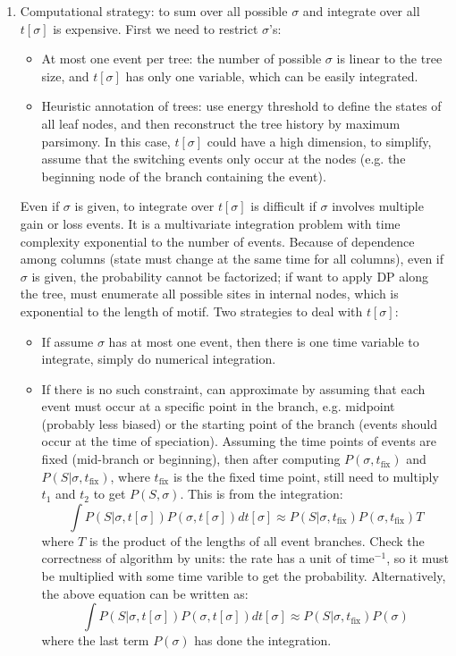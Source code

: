 \documentclass[11pt]{article}
\begin{document}
\begin{enumerate}
\begin{enumerate}
\item Computational strategy: to sum over all possible $\sigma$ and integrate over all $t[\sigma]$ is expensive. First we need to restrict $\sigma$'s: 
\begin{itemize}
\item At most one event per tree: the number of possible $\sigma$ is linear to the tree size, and $t[\sigma]$ has only one variable, which can be easily integrated. 
\item Heuristic annotation of trees: use energy threshold to define the states of all leaf nodes, and then reconstruct the tree history by maximum parsimony. In this case, $t[\sigma]$ could have a high dimension, to simplify, assume that the switching events only occur at the nodes (e.g. the beginning node of the branch containing the event). 
\end{itemize}
Even if $\sigma$ is given, to integrate over $t[\sigma]$ is difficult if $\sigma$ involves multiple gain or loss events. It is a multivariate integration problem with time complexity exponential to the number of events. Because of dependence among columns (state must change at the same time for all columns), even if $\sigma$ is given, the probability cannot be factorized; if want to apply DP along the tree, must enumerate all possible sites in internal nodes, which is exponential to the length of motif. Two strategies to deal with $t[\sigma]$: 
\begin{itemize}
\item If assume $\sigma$ has at most one event, then there is one time variable to integrate, simply do numerical integration. 
\item If there is no such constraint, can approximate by assuming that each event must occur at a specific point in the branch, e.g. midpoint (probably less biased) or the starting point of the branch (events should occur at the time of speciation). Assuming the time points of events are fixed (mid-branch or beginning), then after computing $P(\sigma, t_{\text{fix}})$ and $P(S|\sigma, t_{\text{fix}})$, where $t_{\text{fix}}$ is the the fixed time point, still need to multiply $t_1$ and $t_2$ to get $P(S, \sigma)$. This is from the integration: 
\begin{equation}
\int{P(S|\sigma,t[\sigma])P(\sigma,t[\sigma])dt[\sigma]} \approx P(S|\sigma, t_{\text{fix}}) P(\sigma, t_{\text{fix}}) T
\end{equation}
where $T$ is the product of the lengths of all event branches. Check the correctness of algorithm by units: the rate has a unit of $\text{time}^{-1}$, so it must be multiplied with some time varible to get the probability. Alternatively, the above equation can be written as:
\begin{equation}
\int{P(S|\sigma,t[\sigma])P(\sigma,t[\sigma])dt[\sigma]} \approx P(S|\sigma, t_{\text{fix}}) P(\sigma) 
\end{equation} 
where the last term $P(\sigma)$ has done the integration. 
\end{itemize}


\end{enumerate}
\end{enumerate}
\end{document}

